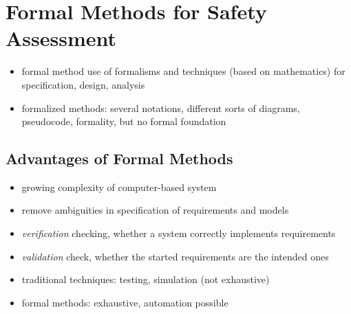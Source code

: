 \documentclass[a4paper, 10pt]{article}
\begin{document}

\section*{Formal Methods for Safety Assessment}
\begin{itemize}
    \item formal method \follows use of formalisms and techniques (based on mathematics) for specification, design, analysis
    \item formalized methods: several notations, different sorts of diagrams, pseudocode, formality, but no formal foundation
\end{itemize}

\subsection*{Advantages of Formal Methods}
\begin{itemize}
    \item growing complexity of computer-based system
    \item remove ambiguities in specification of requirements and models
    \item \emph{verification} checking, whether a system correctly implements requirements
    \item \emph{validation} check, whether the started requirements are the intended ones
    \item traditional techniques: testing, simulation (not exhaustive)
    \item formal methods: exhaustive, automation possible
\end{itemize}
\end{document}
